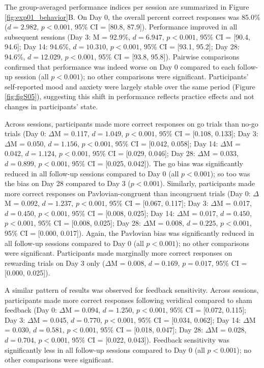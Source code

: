 \documentclass[a4paper,12pt]{article}
\begin{document}
\begin{refsection}[main]
The group-averaged performance indices per session are summarized in Figure \ref{fig:exp01_behavior}B. On Day 0, the overall percent correct responses was 85.0\% ($d = 2.982$, $p < 0.001$, 95\% CI = [80.8, 87.9]). Performance improved in all subsequent sessions (Day 3: M = 92.9\%, $d = 6.947$, $p < 0.001$, 95\% CI = [90.4, 94.6]; Day 14: 94.6\%, $d = 10.310$, $p < 0.001$, 95\% CI = [93.1, 95.2]; Day 28: 94.6\%, $d=12.029$, $p < 0.001$, 95\% CI = [93.8, 95.8]). Pairwise comparisons confirmed that performance was indeed worse on Day 0 compared to each follow-up session (all $p < 0.001$); no other comparisons were significant. Participants' self-reported mood and anxiety were largely stable over the same period (Figure \ref{fig:figS05}), suggesting this shift in performance reflects practice effects and not changes in participants' state. 

Across sessions, participants made more correct responses on go trials than no-go trials (Day 0: $\Delta$M = 0.117, $d = 1.049$, $p < 0.001$, 95\% CI = [0.108, 0.133]; Day 3: $\Delta$M = 0.050, $d = 1.156$, $p < 0.001$, 95\% CI = [0.042, 0.058]; Day 14: $\Delta$M = 0.042, $d = 1.124$, $p < 0.001$, 95\% CI = [0.029, 0.046]; Day 28: $\Delta$M = 0.033, $d = 0.899$, $p < 0.001$, 95\% CI = [0.025, 0.042]). The go bias was significantly reduced in all follow-up sessions compared to Day 0 (all $p < 0.001$); so too was the bias on Day 28 compared to Day 3 ($p < 0.001$). Similarly, participants made more correct responses on Pavlovian-congruent than incongruent trials (Day 0: $\Delta$M = 0.092, $d = 1.237$, $p < 0.001$, 95\% CI = [0.067, 0.117]; Day 3: $\Delta$M = 0.017, $d = 0.450$, $p < 0.001$, 95\% CI = [0.008, 0.025]; Day 14: $\Delta$M = 0.017, $d = 0.450$, $p < 0.001$, 95\% CI = [0.008, 0.025]; Day 28: $\Delta$M = 0.008, $d = 0.225$, $p < 0.001$, 95\% CI = [0.000, 0.017]). Again, the Pavlovian bias was significantly reduced in all follow-up sessions compared to Day 0 (all $p < 0.001$); no other comparisons were significant. Participants made marginally more correct responses on rewarding trials on Day 3 only ($\Delta$M = 0.008, $d=0.169$, $p = 0.017$, 95\% CI = [0.000, 0.025]).

A similar pattern of results was observed for feedback sensitivity. Across sessions, participants made more correct responses following veridical compared to sham feedback (Day 0: $\Delta$M = 0.094, $d = 1.250$, $p < 0.001$, 95\% CI = [0.072, 0.115]; Day 3: $\Delta$M = 0.045, $d = 0.770$, $p < 0.001$, 95\% CI = [0.034, 0.062]; Day 14: $\Delta$M = 0.030, $d = 0.581$, $p < 0.001$, 95\% CI = [0.018, 0.047]; Day 28: $\Delta$M = 0.028, $d = 0.704$, $p < 0.001$, 95\% CI = [0.022, 0.043]). Feedback sensitivity was significantly less in all follow-up sessions compared to Day 0 (all $p < 0.001$); no other comparisons were significant.


\end{refsection}
\end{document}
